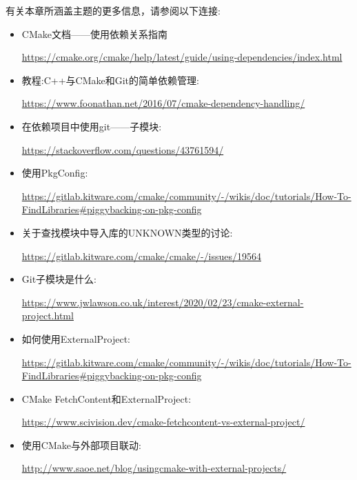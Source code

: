 有关本章所涵盖主题的更多信息，请参阅以下连接:

\begin{itemize}
\item 
CMake文档——使用依赖关系指南

\url{https://cmake.org/cmake/help/latest/guide/using-dependencies/index.html}

\item 
教程:C++与CMake和Git的简单依赖管理:

\url{https://www.foonathan.net/2016/07/cmake-dependency-handling/}

\item 
在依赖项目中使用git——子模块:

\url{ https://stackoverflow.com/questions/43761594/}


\item 
使用PkgConfig:

\url{https://gitlab.kitware.com/cmake/community/-/wikis/doc/tutorials/How-To-FindLibraries\#piggybacking-on-pkg-config}

\item 
关于查找模块中导入库的UNKNOWN类型的讨论:

\url{https://gitlab.kitware.com/cmake/cmake/-/issues/19564}

\item 
Git子模块是什么:

\url{https://www.jwlawson.co.uk/interest/2020/02/23/cmake-external-project.html}

\item 
如何使用ExternalProject:

\url{https://gitlab.kitware.com/cmake/community/-/wikis/doc/tutorials/How-To-FindLibraries\#piggybacking-on-pkg-config}

\item 
CMake FetchContent和ExternalProject: 

\url{ https://www.scivision.dev/cmake-fetchcontent-vs-external-project/}

\item 
使用CMake与外部项目联动:

\url{http://www.saoe.net/blog/usingcmake-with-external-projects/}
\end{itemize}